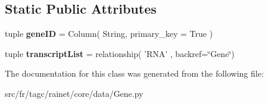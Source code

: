 \subsection*{Static Public Attributes}
\begin{DoxyCompactItemize}
\item 
\hypertarget{classsrc_1_1fr_1_1tagc_1_1rainet_1_1core_1_1data_1_1Gene_1_1Gene_a11a3ce9ade4324a4daa5258a8c667657}{tuple {\bfseries gene\-I\-D} = Column( String, primary\-\_\-key = True )}\label{classsrc_1_1fr_1_1tagc_1_1rainet_1_1core_1_1data_1_1Gene_1_1Gene_a11a3ce9ade4324a4daa5258a8c667657}

\item 
\hypertarget{classsrc_1_1fr_1_1tagc_1_1rainet_1_1core_1_1data_1_1Gene_1_1Gene_aa55affe2b6fefc7fd5f80eb221b23447}{tuple {\bfseries transcript\-List} = relationship( 'R\-N\-A' , backref=\char`\"{}Gene\char`\"{})}\label{classsrc_1_1fr_1_1tagc_1_1rainet_1_1core_1_1data_1_1Gene_1_1Gene_aa55affe2b6fefc7fd5f80eb221b23447}

\end{DoxyCompactItemize}


The documentation for this class was generated from the following file\-:\begin{DoxyCompactItemize}
\item 
src/fr/tagc/rainet/core/data/Gene.\-py\end{DoxyCompactItemize}
